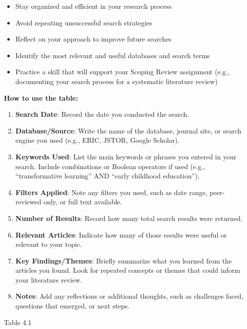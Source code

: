 \documentclass[
  letterpaper,
  DIV=11,
  numbers=noendperiod]{scrreprt}
\providecommand{\tightlist}{%
  \setlength{\itemsep}{0pt}\setlength{\parskip}{0pt}}\usepackage{longtable,booktabs,array}
\begin{document}
\begin{itemize}
\tightlist
\item
  Stay organized and efficient in your research process
\item
  Avoid repeating unsuccessful search strategies
\item
  Reflect on your approach to improve future searches
\item
  Identify the most relevant and useful databases and search terms
\item
  Practice a skill that will support your Scoping Review assignment
  (e.g., documenting your search process for a systematic literature
  review)
\end{itemize}

\textbf{How to use the table:}

\begin{enumerate}
\def\labelenumi{\arabic{enumi}.}
\tightlist
\item
  \textbf{Search Date}: Record the date you conducted the search.
\item
  \textbf{Database/Source}: Write the name of the database, journal
  site, or search engine you used (e.g., ERIC, JSTOR, Google Scholar).
\item
  \textbf{Keywords Used}: List the main keywords or phrases you entered
  in your search. Include combinations or Boolean operators if used
  (e.g., ``transformative learning'' AND ``early childhood education'').
\item
  \textbf{Filters Applied}: Note any filters you used, such as date
  range, peer-reviewed only, or full text available.
\item
  \textbf{Number of Results}: Record how many total search results were
  returned.
\item
  \textbf{Relevant Articles}: Indicate how many of those results were
  useful or relevant to your topic.
\item
  \textbf{Key Findings/Themes}: Briefly summarize what you learned from
  the articles you found. Look for repeated concepts or themes that
  could inform your literature review.
\item
  \textbf{Notes}: Add any reflections or additional thoughts, such as
  challenges faced, questions that emerged, or next steps.
\end{enumerate}

Table 4.1
\end{document}
